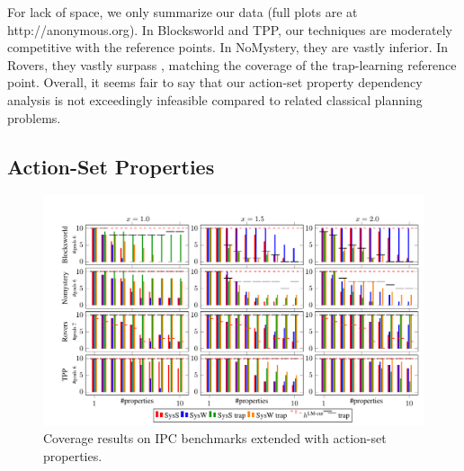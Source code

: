 For lack of space, we only summarize our data (full plots are at
{\color{red}http://anonymous.org}).
%
%
In Blocksworld and TPP, our techniques are moderately competitive with
the reference points. In NoMystery, they are vastly inferior. In
Rovers, they vastly surpass \hlmcut, matching the coverage of the
trap-learning reference point. Overall, it seems fair to say that our
action-set property dependency analysis is not exceedingly infeasible
compared to related classical planning problems.




\fi









\ifdefined\longflagdefined

\subsection{Action-Set Properties}

\begin{figure}[htb]
\centering\centering
%
\includegraphics{data/action_set_properties/barchart/barchart.pdf}
\vspace{-0.6cm}
\caption{Coverage results on IPC benchmarks extended with action-set properties.}
\label{fig:barcharts}
\vspace{-0.2cm}
\end{figure}


